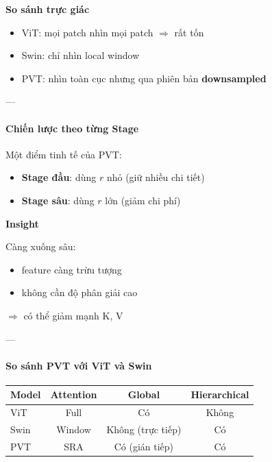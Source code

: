 \begin{mdframed}[style=infobox]
	\textbf{So sánh trực giác}
	
	\begin{itemize}
		\item ViT: mọi patch nhìn mọi patch $\Rightarrow$ rất tốn
		\item Swin: chỉ nhìn local window
		\item PVT: nhìn toàn cục nhưng qua phiên bản \textbf{downsampled}
	\end{itemize}
\end{mdframed}

---

\paragraph{Chiến lược theo từng Stage}

Một điểm tinh tế của PVT:

\begin{itemize}
	\item \textbf{Stage đầu}: dùng $r$ nhỏ (giữ nhiều chi tiết)
	\item \textbf{Stage sâu}: dùng $r$ lớn (giảm chi phí)
\end{itemize}

\begin{mdframed}[style=infobox]
	\textbf{Insight}
	
	Càng xuống sâu:
	\begin{itemize}
		\item feature càng trừu tượng
		\item không cần độ phân giải cao
	\end{itemize}
	$\Rightarrow$ có thể giảm mạnh K, V
\end{mdframed}

---

\paragraph{So sánh PVT với ViT và Swin}

\begin{center}
	\begin{tabular}{l|c|c|c}
		\textbf{Model} & \textbf{Attention} & \textbf{Global} & \textbf{Hierarchical} \\
		\hline
		ViT & Full & Có & Không \\
		Swin & Window & Không (trực tiếp) & Có \\
		PVT & SRA & Có (gián tiếp) & Có \\
	\end{tabular}
\end{center}

